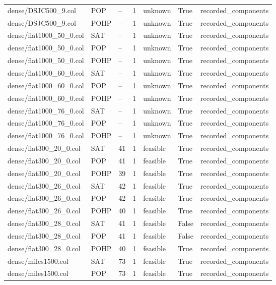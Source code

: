\begin{table}[htbp]
\begin{tabular}{lllllll}
dense/DSJC500\_9.col & POP & -- & 1 & unknown & True & recorded\_components \\
dense/DSJC500\_9.col & POHP & -- & 1 & unknown & True & recorded\_components \\
dense/flat1000\_50\_0.col & SAT & -- & 1 & unknown & True & recorded\_components \\
dense/flat1000\_50\_0.col & POP & -- & 1 & unknown & True & recorded\_components \\
dense/flat1000\_50\_0.col & POHP & -- & 1 & unknown & True & recorded\_components \\
dense/flat1000\_60\_0.col & SAT & -- & 1 & unknown & True & recorded\_components \\
dense/flat1000\_60\_0.col & POP & -- & 1 & unknown & True & recorded\_components \\
dense/flat1000\_60\_0.col & POHP & -- & 1 & unknown & True & recorded\_components \\
dense/flat1000\_76\_0.col & SAT & -- & 1 & unknown & True & recorded\_components \\
dense/flat1000\_76\_0.col & POP & -- & 1 & unknown & True & recorded\_components \\
dense/flat1000\_76\_0.col & POHP & -- & 1 & unknown & True & recorded\_components \\
dense/flat300\_20\_0.col & SAT & 41 & 1 & feasible & True & recorded\_components \\
dense/flat300\_20\_0.col & POP & 41 & 1 & feasible & True & recorded\_components \\
dense/flat300\_20\_0.col & POHP & 39 & 1 & feasible & True & recorded\_components \\
dense/flat300\_26\_0.col & SAT & 42 & 1 & feasible & True & recorded\_components \\
dense/flat300\_26\_0.col & POP & 42 & 1 & feasible & True & recorded\_components \\
dense/flat300\_26\_0.col & POHP & 40 & 1 & feasible & True & recorded\_components \\
dense/flat300\_28\_0.col & SAT & 41 & 1 & feasible & False & recorded\_components \\
dense/flat300\_28\_0.col & POP & 41 & 1 & feasible & False & recorded\_components \\
dense/flat300\_28\_0.col & POHP & 40 & 1 & feasible & True & recorded\_components \\
dense/miles1500.col & SAT & 73 & 1 & feasible & True & recorded\_components \\
dense/miles1500.col & POP & 73 & 1 & feasible & True & recorded\_components \\

\end{tabular}
\end{table}
